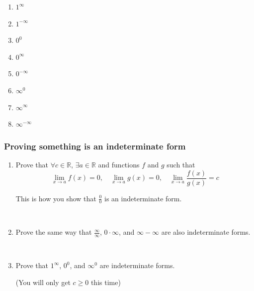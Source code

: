 \documentclass[14pt]{beamer}
\begin{document}
\begin{frame}[t]
\begin{multicols}{4}
\begin{enumerate}
			\item $\displaystyle 1^{\infty}$

			\item $\displaystyle 1^{-\infty}$

			\item $\displaystyle 0^{0}$

			\item $\displaystyle 0^{\infty}$

			\item $\displaystyle 0^{-\infty}$

			\item $\displaystyle \infty^{0}$

			\item $\displaystyle \infty^{\infty}$

			\item $\displaystyle \infty^{-\infty}$
		\end{enumerate}
	\end{multicols}
\end{frame}

\begin{frame}[t]
	\fontsize{13}{13}\selectfont
	\frametitle{Proving something is an indeterminate form}

	\begin{enumerate}
		\item Prove that $\displaystyle \forall c \in \mathbb{R}$,
			$\displaystyle \exists a \in \mathbb{R}$ and functions $f$ and $g$ such
			that
			\[
				\lim_{x \to a}f(x) = 0, \quad \lim_{x \to a}g(x) =0, \quad \lim_{x \to a}
				\frac{f(x)}{g(x)}= c
			\]

			This is how you show that $\displaystyle \frac{0}{0}$ is an indeterminate form.

			\

		\item Prove the same way that $\displaystyle \frac{\infty}{\infty}$,
			$\displaystyle 0 \cdot \infty$, and $\displaystyle \infty - \infty$ are also
			indeterminate forms.

			\

		\item Prove that $\displaystyle 1^{\infty}$, $\displaystyle 0^{0}$, and $\displaystyle
			\infty^{0}$ are indeterminate forms.

			(You will only get $c \geq 0$ this time)
	\end{enumerate}
\end{frame}
\end{document}
